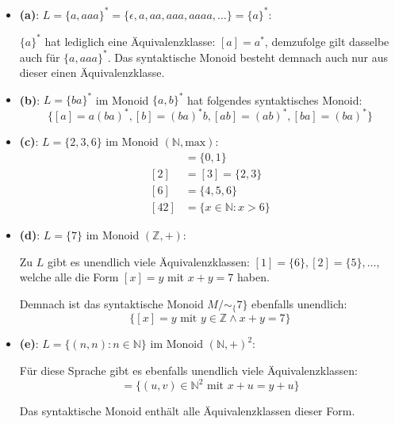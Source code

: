 \documentclass{scrartcl}
\begin{document}
\begin{itemize}
\item \textbf{(a)}: $L = \{a, aaa\}^* = \{\epsilon, a, aa, aaa, aaaa, \ldots\} = \{a\}^*$:

  $\{a\}^*$ hat lediglich eine Äquivalenzklasse: $[a] = a^*$, demzufolge gilt dasselbe auch für $\{a, aaa\}^*$. Das syntaktische Monoid besteht demnach auch nur aus dieser einen Äquivalenzklasse.

\item \textbf{(b)}: $L = \{ba\}^*$ im Monoid $\{a, b\}^*$ hat folgendes syntaktisches Monoid:
  \begin{equation*}
    \{[a] = a(ba)^*, [b] = (ba)^*b, [ab] = (ab)^*, [ba] = (ba)^*\}
  \end{equation*}

\item \textbf{(c)}: $L = \{2, 3, 6\}$ im Monoid $(\mathbb{N}, \text{max})$:
  \begin{align*}
    [1] &= \{0, 1\}\\
    [2] &= [3] = \{2, 3\}\\
    [6] &= \{4, 5, 6\}\\
    [42] &= \{x \in \mathbb{N} : x > 6\}
  \end{align*}

\item \textbf{(d)}: $L = \{7\}$ im Monoid $(\mathbb{Z}, +)$:

  Zu $L$ gibt es unendlich viele Äquivalenzklassen: $[1] = \{6\}, [2] = \{5\}, \ldots$, welche alle die Form $[x] = y$ mit $x + y = 7$ haben.

  Demnach ist das syntaktische Monoid $M/\sim_\{7\}$ ebenfalls unendlich:
  \begin{equation*}
    \{[x] = y \text{ mit } y \in \mathbb{Z} \wedge x + y = 7\}
  \end{equation*}

\item \textbf{(e)}: $L = \{(n, n) : n \in \mathbb{N}\}$ im Monoid $(\mathbb{N}, +)^2$:

  Für diese Sprache gibt es ebenfalls unendlich viele Äquivalenzklassen:
  \begin{equation*}
    [(x, y)] = \{(u, v) \in \mathbb{N}^2 \text{ mit } x + u = y + u\}
  \end{equation*}

  Das syntaktische Monoid enthält alle Äquivalenzklassen dieser Form.
\end{itemize}
\end{document}
